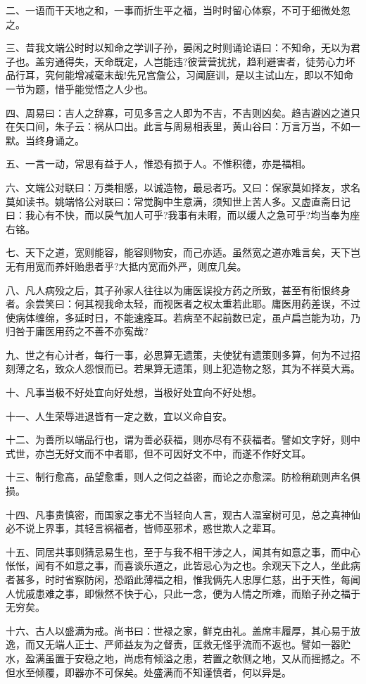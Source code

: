 \documentclass[letterpaper,10pt,english]{sphinxmanual}
\begin{document}
二、一语而干天地之和，一事而折生平之福，当时时留心体察，不可于细微处忽之。

三、昔我文端公时时以知命之学训子孙，晏闲之时则诵论语曰：不知命，无以为君子也。盖穷通得失，天命既定，人岂能违?彼营营扰扰，趋利避害者，徒劳心力坏品行耳，究何能增减毫末哉!先兄宫詹公，习闻庭训，是以主试山左，即以不知命一节为题，惜乎能觉悟之人少也。

四、周易曰：吉人之辞寡，可见多言之人即为不吉，不吉则凶矣。趋吉避凶之道只在矢口间，朱子云：祸从口出。此言与周易相表里，黄山谷曰：万言万当，不如一默。当终身诵之。

五、一言一动，常思有益于人，惟恐有损于人。不惟积德，亦是福相。

六、文端公对联曰：万类相感，以诚造物，最忌者巧。又曰：保家莫如择友，求名莫如读书。姚端恪公对联曰：常觉胸中生意满，须知世上苦人多。又虚直斋日记曰：我心有不快，而以戾气加人可乎?我事有未暇，而以缓人之急可乎?均当奉为座右铭。

七、天下之道，宽则能容，能容则物安，而己亦适。虽然宽之道亦难言矣，天下岂无有用宽而养奸贻患者乎?大抵内宽而外严，则庶几矣。

八、凡人病殁之后，其子孙家人往往以为庸医误投方药之所致，甚至有衔恨终身者。余尝笑曰：何其视我命太轻，而视医者之权太重若此耶。庸医用药差误，不过使病体缠绵，多延时日，不能速痊耳。若病至不起前数已定，虽卢扁岂能为功，乃归咎于庸医用药之不善不亦寃哉?

九、世之有心计者，每行一事，必思算无遗策，夫使犹有遗策则多算，何为不过招刻薄之名，致众人怨恨而已。若果算无遗策，则上犯造物之怒，其为不祥莫大焉。

十、凡事当极不好处宜向好处想，当极好处宜向不好处想。

十一、人生荣辱进退皆有一定之数，宜以义命自安。

十二、为善所以端品行也，谓为善必获福，则亦尽有不获福者。譬如文字好，则中式世，亦岂无好文而不中者耶，但不可因好文不中，而遂不作好文耳。

十三、制行愈高，品望愈重，则人之伺之益密，而论之亦愈深。防检稍疏则声名俱损。

十四、凡事贵慎密，而国家之事尤不当轻向人言，观古人温室树可见，总之真神仙必不说上界事，其轻言祸福者，皆师巫邪术，惑世欺人之辈耳。

十五、同居共事则猜忌易生也，至于与我不相干涉之人，闻其有如意之事，而中心怅怅，闻有不如意之事，而喜谈乐道之，此皆忌心为之也。余观天下之人，坐此病者甚多，时时省察防闲，恐蹈此薄福之相，惟我俩先人忠厚仁慈，出于天性，每闻人忧戚患难之事，即愀然不快于心，只此一念，便为人情之所难，而贻子孙之福于无穷矣。

十六、古人以盛满为戒。尚书曰：世禄之家，鲜克由礼。盖席丰履厚，其心易于放逸，而又无端人正士、严师益友为之督责，匡救无怪乎流而不返也。譬如一器贮水，盈满虽置于安稳之地，尚虑有倾溢之患，若置之欹侧之地，又从而摇撼之。不但水至倾覆，即器亦不可保矣。处盛满而不知谨慎者，何以异是。
\end{document}
